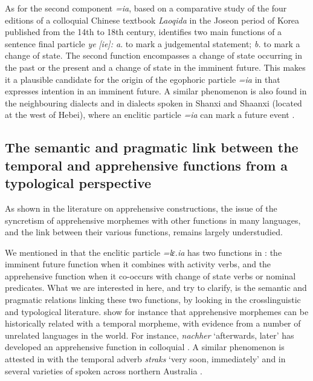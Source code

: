 \documentclass[output=paper,colorlinks,citecolor=brown, language=chinese]{langscibook}
\begin{document}
As for the second component \textit{=ia}, based on a comparative study of the four editions of a colloquial Chinese textbook \textit{Laoqida} in the Joseon period of Korea published from the 14th to 18th century, \citet{Takekoshi2002} identifies two main functions of a sentence final particle \textit{ye} \textit{[ie]: a}. to mark a judgemental statement; \textit{b.} to mark a change of state. The second function encompasses a change of state occurring in the past or the present and a change of state in the imminent future. This makes it a plausible candidate for the origin of the egophoric particle \textit{=ia} in  that expresses intention in an imminent future. A similar phenomenon is also found in the neighbouring  dialects and in  dialects spoken in Shanxi and Shaanxi (located at the west of Hebei), where an enclitic particle \textit{=ia} can mark a future event \citep{Xing2002,Xing2005,Lü1995,Shi2004}. 




\subsection{The semantic and pragmatic link between the temporal and apprehensive functions from a typological perspective}
\label{subsec:sempraglink}

As shown in the literature on apprehensive constructions, the issue of the syncretism of apprehensive morphemes with other functions in many languages, and the link between their various functions, remains largely understudied.

We mentioned in   that the enclitic particle \textit{=lɛ.ia} has two functions in : the imminent future function when it combines with activity verbs, and the apprehensive function when it co-occurs with change of state verbs or nominal predicates. What we are interested in here, and try to clarify, is the semantic and pragmatic relations linking these two functions, by looking in the crosslinguistic and typological literature. \citet{AngeloSchultze-Berndt2016} show for instance that apprehensive morphemes can be historically related with a temporal morpheme, with evidence from a number of unrelated languages in the world. For instance, \textit{nachher} `afterwards, later' has developed an apprehensive function in colloquial . A similar phenomenon is attested in  with the temporal adverb \textit{straks} `very soon, immediately' and in several varieties of  spoken across northern Australia \citep{boogaart2009,boogaart2020,AngeloSchultze-Berndt2016}.
\end{document}
